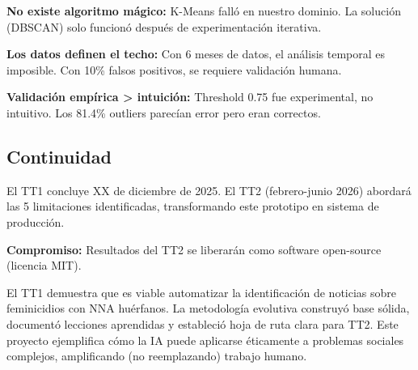 \textbf{No existe algoritmo mágico:} K-Means falló en nuestro dominio. La solución (DBSCAN) solo funcionó después de experimentación iterativa.

\textbf{Los datos definen el techo:} Con 6 meses de datos, el análisis temporal es imposible. Con 10\% falsos positivos, se requiere validación humana.

\textbf{Validación empírica > intuición:} Threshold 0.75 fue experimental, no intuitivo. Los 81.4\% outliers parecían error pero eran correctos.

\subsection{Continuidad}
\label{subsec:declaracion_continuidad}

El TT1 concluye XX de diciembre de 2025. El TT2 (febrero-junio 2026) abordará las 5 limitaciones identificadas, transformando este prototipo en sistema de producción.

\textbf{Compromiso:} Resultados del TT2 se liberarán como software open-source (licencia MIT).

\vspace{0.5cm}

El TT1 demuestra que es viable automatizar la identificación de noticias sobre feminicidios con NNA huérfanos. La metodología evolutiva construyó base sólida, documentó lecciones aprendidas y estableció hoja de ruta clara para TT2. Este proyecto ejemplifica cómo la IA puede aplicarse éticamente a problemas sociales complejos, amplificando (no reemplazando) trabajo humano.